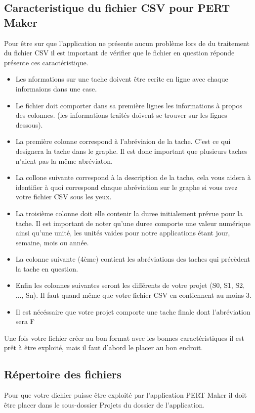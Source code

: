 \documentclass{article}
\begin{document}
\subsection{Caracteristique du fichier CSV pour PERT Maker}
Pour être sur que l'application ne présente aucun problème lors de du traitement du fichier CSV il est important de vérifier que le fichier en question réponde présente ces caractéristique.
\begin{itemize}
    \item Les nformations sur une tache doivent être ecrite en ligne avec chaque informaions dans une case.
    \item Le fichier doit comporter dans sa première lignes les informations à propos des colonnes. (les informations traités doivent se trouver sur les lignes dessous).
    \item La première colonne correspond à l'abréviaion de la tache. C'est ce qui designera la tache dans le graphe. Il est donc important que plusieurs taches n'aient pas la même abréviaton.
    \item La collone suivante correspond à la description de la tache, cela vous aidera à identifier à quoi correspond chaque abréviation sur le graphe si vous avez votre fichier CSV sous les yeux.
    \item La troisième colonne doit elle contenir la duree initialement prévue pour la tache. Il est important de noter qu'une duree comporte une valeur numérique ainsi qu'une unité, les unités vaides pour notre applications étant jour, semaine, mois ou année.
    \item La colonne suivante (4ème) contient les abréviations des taches qui précèdent la tache en question.
    \item Enfin les colonnes suivantes seront les différents de votre projet (S0, S1, S2, ..., Sn). Il faut quand même que votre fichier CSV en contiennent au moins 3.
    \item Il est nécéssaire que votre projet comporte une tache finale dont l'abréviation sera F
\end{itemize}
Une fois votre fichier créer au bon format avec les bonnes caractéristiques il est prêt à être exploité, mais il faut d'abord le placer au bon endroit.

\subsection{Répertoire des fichiers}
Pour que votre dichier puisse être exploité par l'application PERT Maker il doit être placer dans le sous-dossier Projets du dossier de l'application.
\end{document}
